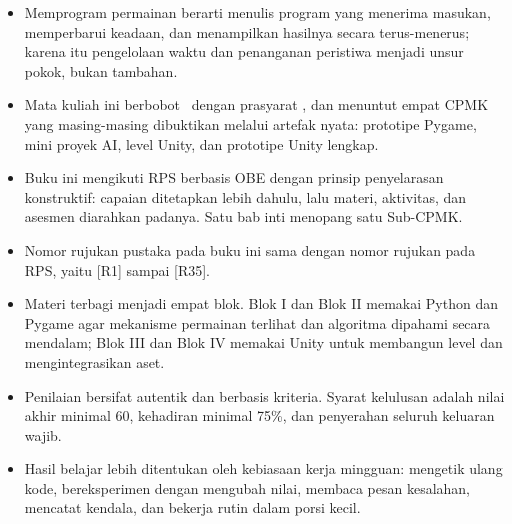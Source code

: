 
\begin{rangkumanbox}
\begin{itemize}
  \item Memprogram permainan berarti menulis program yang menerima masukan,
        memperbarui keadaan, dan menampilkan hasilnya secara terus-menerus;
        karena itu pengelolaan waktu dan penanganan peristiwa menjadi unsur
        pokok, bukan tambahan.
  \item Mata kuliah ini berbobot \BobotSKS\ dengan prasyarat
        \MataKuliahPrasyarat, dan menuntut empat CPMK yang masing-masing
        dibuktikan melalui artefak nyata: prototipe Pygame, mini proyek AI,
        level Unity, dan prototipe Unity lengkap.
  \item Buku ini mengikuti RPS berbasis OBE dengan prinsip penyelarasan
        konstruktif: capaian ditetapkan lebih dahulu, lalu materi, aktivitas,
        dan asesmen diarahkan padanya. Satu bab inti menopang satu Sub-CPMK.
  \item Nomor rujukan pustaka pada buku ini sama dengan nomor rujukan pada
        RPS, yaitu \mbox{[R1]} sampai \mbox{[R35]}.
  \item Materi terbagi menjadi empat blok. Blok I dan Blok II memakai Python
        dan Pygame agar mekanisme permainan terlihat dan algoritma dipahami
        secara mendalam; Blok III dan Blok IV memakai Unity untuk membangun
        level dan mengintegrasikan aset.
  \item Penilaian bersifat autentik dan berbasis kriteria. Syarat kelulusan
        adalah nilai akhir minimal 60, kehadiran minimal 75\%, dan penyerahan
        seluruh keluaran wajib.
  \item Hasil belajar lebih ditentukan oleh kebiasaan kerja mingguan:
        mengetik ulang kode, bereksperimen dengan mengubah nilai, membaca
        pesan kesalahan, mencatat kendala, dan bekerja rutin dalam porsi
        kecil.
\end{itemize}
\end{rangkumanbox}
